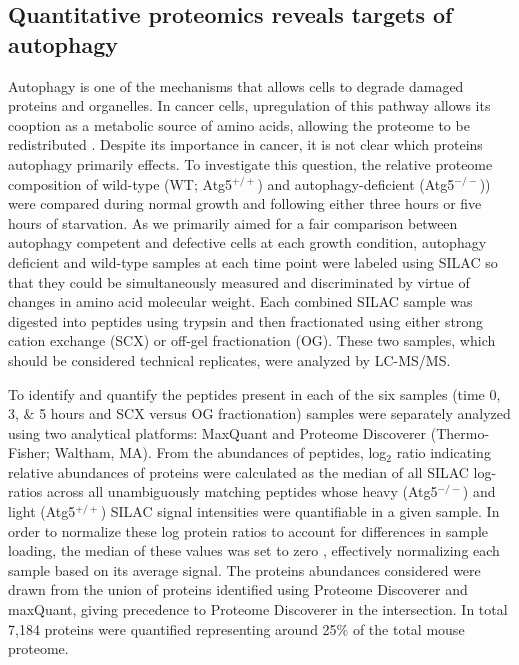 \subsection{Quantitative proteomics reveals targets of autophagy}
  
 Autophagy is one of the mechanisms that allows cells to degrade damaged proteins and organelles.  In cancer cells, upregulation of this pathway allows its cooption as a metabolic source of amino acids, allowing the proteome to be redistributed \cite{Rabinowitz:2010fx}.  Despite its importance in cancer, it is not clear which proteins autophagy primarily effects.  To investigate this question, the relative proteome composition of wild-type (WT; Atg5$^{+/+}$) and  autophagy-deficient (Atg5$^{-/-}$)) were compared during normal growth and following either three hours or five hours of starvation.  As we primarily aimed for a fair comparison between autophagy competent and defective cells at each growth condition, autophagy deficient and wild-type samples at each time point were labeled using SILAC \cite{Ong:2002tf} so that they could be simultaneously measured and discriminated by virtue of changes in amino acid molecular weight.  Each combined SILAC sample was digested into peptides using trypsin and then fractionated using either strong cation exchange (SCX) or off-gel fractionation (OG).  These two samples, which should be considered technical replicates, were analyzed by LC-MS/MS.  
 
To identify and quantify the peptides present in each of the six samples (time 0, 3, $\&$ 5 hours and SCX versus OG fractionation) samples were separately analyzed using two analytical platforms: MaxQuant \cite{Cox:2008ir} and Proteome Discoverer (Thermo-Fisher; Waltham, MA). From the abundances of peptides, log$_{2}$ ratio indicating relative abundances of proteins were calculated as the median of all SILAC log-ratios across all unambiguously matching peptides whose heavy (Atg5$^{-/-}$) and light (Atg5$^{+/+}$) SILAC signal intensities were quantifiable in a given sample. In order to normalize these log protein ratios to account for differences in sample loading, the median of these values was set to zero \cite{Cox:2008ir}, effectively normalizing each sample based on its average signal. The proteins abundances considered were drawn from the union of proteins identified using Proteome Discoverer and maxQuant, giving precedence to Proteome Discoverer in the intersection. In total 7,184 proteins were quantified representing around 25$\%$ of the total mouse proteome.
 
